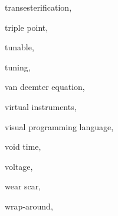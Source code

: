 \begin{theindex}
  \item \lowercase {transesterification}, 
  \item \lowercase {triple point}, 
  \item \lowercase {tunable}, 
  \item \lowercase {tuning}, 
  \item \lowercase {Van Deemter equation}, 
  \item \lowercase {virtual instruments}, 
  \item \lowercase {visual programming language}, 
  \item \lowercase {void time}, 
  \item \lowercase {voltage}, 
  \item \lowercase {wear scar}, 
  \item \lowercase {wrap-around}, 

\end{theindex}
 